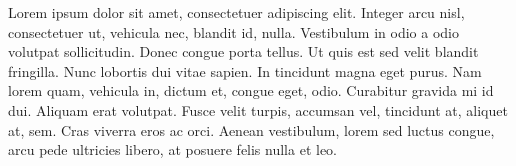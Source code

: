 Lorem ipsum dolor sit amet, consectetuer adipiscing elit. Integer arcu nisl, consectetuer ut, vehicula nec, blandit id, nulla. Vestibulum in odio a odio volutpat sollicitudin. Donec congue porta tellus. Ut quis est sed velit blandit fringilla. Nunc lobortis dui vitae sapien. In tincidunt magna eget purus. Nam lorem quam, vehicula in, dictum et, congue eget, odio. Curabitur gravida mi id dui. Aliquam erat volutpat. Fusce velit turpis, accumsan vel, tincidunt at, aliquet at, sem. Cras viverra eros ac orci. Aenean vestibulum, lorem sed luctus congue, arcu pede ultricies libero, at posuere felis nulla et leo.
